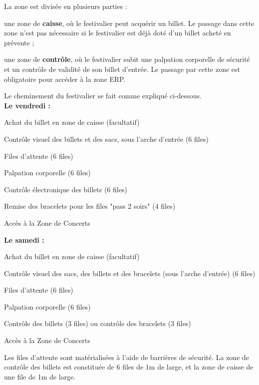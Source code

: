 \documentclass[hidelinks, paper=a4, fontsize=13pt]{report}
\begin{document}
La zone est divisée en plusieurs parties :
\begin{list}{•}{}
	\item une zone de \textbf{caisse}, où le festivalier peut acquérir un billet. Le passage dans cette zone n'est pas nécessaire si le festivalier est déjà doté d'un billet acheté en prévente ;
	\item une zone de \textbf{contrôle}, où le festivalier subit une palpation corporelle de sécurité et un contrôle de validité de son billet d'entrée. Le passage par cette zone est obligatoire pour accéder à la zone ERP.
\end{list}

Le cheminement du festivalier se fait comme expliqué ci-dessous.\\

\textbf{Le vendredi :}
\begin{list}{•}{}
	\item Achat du billet en zone de caisse (facultatif)
	\item Contrôle visuel des billets et des sacs, sous l'arche d'entrée (6 files)
	\item Files d’attente (6 files)
	\item Palpation corporelle (6 files)
	\item Contrôle électronique des billets (6 files)
	\item Remise des bracelets pour les files "pass 2 soirs" (4 files)
	\item Accès à la Zone de Concerts
\end{list}

\textbf{Le samedi :}
\begin{list}{•}{}
	\item Achat du billet en zone de caisse (facultatif)
	\item Contrôle visuel des sacs, des billets et des bracelets (sous l'arche d'entrée) (6 files) 
	\item Files d’attente (6 files)
	\item Palpation corporelle (6 files)
	\item Contrôle des billets (3 files) ou contrôle des bracelets (3 files)
	\item Accès à la Zone de Concerts
	
\end{list}

Les files d’attente sont matérialisées à l’aide de barrières de sécurité. La zone de contrôle des billets est constituée de 6 files de 1m de large, et la zone de caisse de une file de 1m de large. \\
\end{document}
